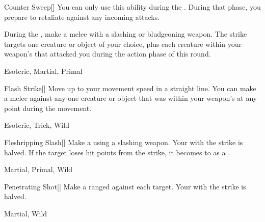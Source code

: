 \lowercase{\hypertarget{maneuver:Counter Sweep}{}}\label{maneuver:Counter Sweep}
\hypertarget{maneuver:Counter Sweep}{}
\begin{freeability}[Rank 4]{Counter Sweep}[]
You can only use this ability during the .
During that phase, you prepare to retaliate against any incoming attacks.

During the , make a melee  with a slashing or bludgeoning weapon.
The strike targets one creature or object of your choice,
plus each creature within your weapon's  that attacked you during the action phase of this round.


 Esoteric, Martial, Primal
\end{freeability}
\vspace{0.25em}



\lowercase{\hypertarget{maneuver:Flash Strike}{}}\label{maneuver:Flash Strike}
\hypertarget{maneuver:Flash Strike}{}
\begin{freeability}[Rank 4]{Flash Strike}[]
Move up to your movement speed in a straight line.
You can make a melee  against any one creature or object that was within your weapon's  at any point during the movement.


 Esoteric, Trick, Wild
\end{freeability}
\vspace{0.25em}



\lowercase{\hypertarget{maneuver:Fleshripping Slash}{}}\label{maneuver:Fleshripping Slash}
\hypertarget{maneuver:Fleshripping Slash}{}
\begin{freeability}[Rank 4]{Fleshripping Slash}[]
Make a  using a slashing weapon.
Your  with the strike is halved.
If the target loses hit points from the strike, it becomes  to  as a .


 Martial, Primal, Wild
\end{freeability}
\vspace{0.25em}



\lowercase{\hypertarget{maneuver:Penetrating Shot}{}}\label{maneuver:Penetrating Shot}
\hypertarget{maneuver:Penetrating Shot}{}
\begin{freeability}[Rank 4]{Penetrating Shot}[]
Make a ranged  against each target.
Your  with the strike is halved.


 Martial, Wild
\end{freeability}
\vspace{0.25em}



